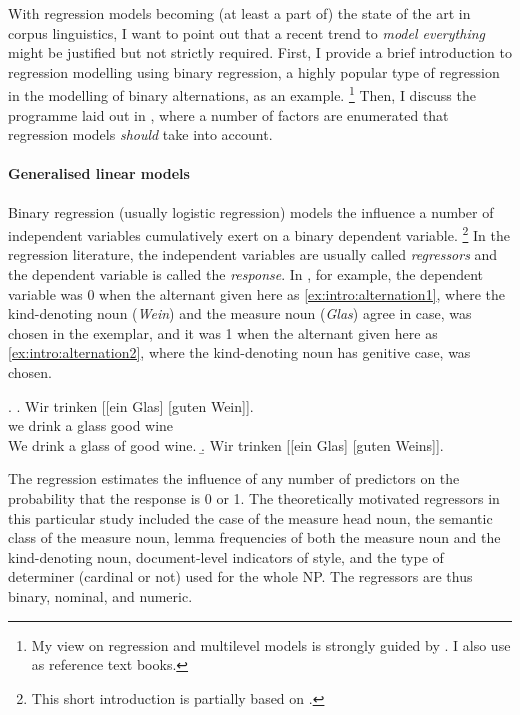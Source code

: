 With regression models becoming (at least a part of) the state of the art in corpus linguistics, I want to point out that a recent trend to \textit{model everything} might be justified but not strictly required.
First, I provide a brief introduction to regression modelling using binary regression, a highly popular type of regression in the modelling of binary alternations, as an example.%
\footnote{My view on regression and multilevel models is strongly guided by \citet{GelmanHill2006}.
I also use \citet{ZuurEa2009,FahrmeirEa2013,Fox2016} as reference text books.}
Then, I discuss the programme laid out in \citet{Gries2017a}, where a number of factors are enumerated that regression models \textit{should} take into account.

\paragraph{Generalised linear models}

Binary regression (usually logistic regression) models the influence a number of independent variables cumulatively exert on a binary dependent variable.%
\footnote{This short introduction is partially based on \citet{Schaefer2019a}.}
In the regression literature, the independent variables are usually called \textit{regressors} and the dependent variable is called the \textit{response}.
In \ROMeasure, for example, the dependent variable was 0 when the alternant given here as \ref{ex:intro:alternation1}, where the kind-denoting noun (\textit{Wein}) and the measure noun (\textit{Glas}) agree in case, was chosen in the exemplar, and it was 1 when the alternant given here as \ref{ex:intro:alternation2}, where the kind-denoting noun has genitive case, was chosen.

\ex.\label{ex:intro:alternation}
    \ag. Wir trinken [[ein Glas] [guten Wein]].\\
         we drink a glass good wine \\
         \glt We drink a glass of good wine.\label{ex:intro:alternation1}
    \b.  Wir trinken [[ein Glas] [guten Weins]].\label{ex:intro:alternation2}

The regression estimates the influence of any number of predictors on the probability that the response is 0 or 1.
The theoretically motivated regressors in this particular study included the case of the measure head noun, the semantic class of the measure noun, lemma frequencies of both the measure noun and the kind-denoting noun, document-level indicators of style, and the type of determiner (cardinal or not) used for the whole NP.
The regressors are thus binary, nominal, and numeric.

